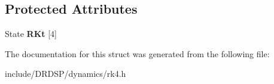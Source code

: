 \subsection*{Protected Attributes}
\begin{DoxyCompactItemize}
\item 
\hypertarget{struct_d_r_d_s_p_1_1_r_k4_ae9aaed854c424eb85df6a8c175ae034e}{State {\bfseries R\-Kt} \mbox{[}4\mbox{]}}\label{struct_d_r_d_s_p_1_1_r_k4_ae9aaed854c424eb85df6a8c175ae034e}

\end{DoxyCompactItemize}


The documentation for this struct was generated from the following file\-:\begin{DoxyCompactItemize}
\item 
include/\-D\-R\-D\-S\-P/dynamics/rk4.\-h\end{DoxyCompactItemize}
